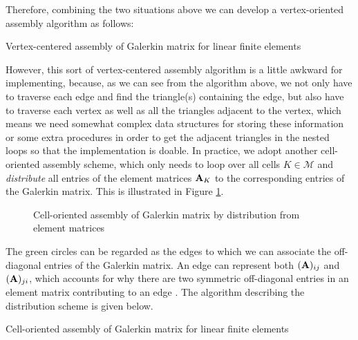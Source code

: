 	Therefore, combining the two situations above we can develop a 
	vertex-oriented assembly algorithm as follows:
	\begin{algorithm}[!htbp]
		\caption{Vertex-centered assembly of Galerkin matrix for
			 linear finite elements}
		\label{alg:assembleGalerkinMatrix_vertex-centered}		
		
	\end{algorithm}
	
	However, this sort of vertex-centered assembly algorithm is a little 
	awkward for implementing, because, as we can see from the algorithm above,
	we not only have to traverse each edge and find the triangle(s) containing
	the edge, but also have to traverse each vertex as well as all the 
	triangles adjacent to the vertex, which means we need somewhat complex data 
	structures for storing these information or some extra procedures in order
	to get the adjacent triangles in the nested loops so that the 
	implementation is doable. In practice, we adopt another cell-oriented 
	assembly scheme, which only needs to loop over all cells $K\in\mathcal{M}$ 
	and \emph{distribute} all entries of the element matrices $\mathbf{A}_K$ 
	to the corresponding entries of the Galerkin matrix. This is illustrated 
	in Figure \ref{tikz:2D_cell-oriented_distribution_by_element_matrices}.
	\begin{figure}[!htbp]
		\centering
		
		\caption{Cell-oriented assembly of Galerkin matrix by distribution
			from element matrices}
		\label{tikz:2D_cell-oriented_distribution_by_element_matrices}
	\end{figure}

	The green circles \greencircle{} can be regarded as the edges to which we 
	can associate the off-diagonal entries of the Galerkin matrix. An edge can 
	represent both $(\mathbf{A})_{ij}$ and $(\mathbf{A})_{ji}$, which accounts 
	for why there are two symmetric off-diagonal entries in an element matrix 
	contributing to an edge \greencircle{}. The algorithm describing the
	distribution scheme is given below.
	\begin{algorithm}[!htbp]
		\caption{Cell-oriented assembly of Galerkin matrix for
			linear finite elements}
		\label{alg:assembleGalerkinMatrix_cell-oriented}		
		
	\end{algorithm}	


